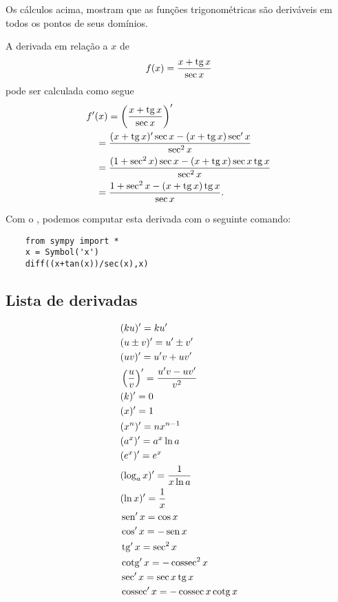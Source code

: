 \begin{obs}
  Os cálculos acima, mostram que as funções trigonométricas são deriváveis em todos os pontos de seus domínios.
\end{obs}

\begin{ex}
  A derivada em relação a $x$ de
  \begin{equation}
    f(x) = \frac{x + \operatorname{tg} x}{\sec x}
  \end{equation}
  pode ser calculada como segue
  \begin{align}
    & f'(x) = \left(\frac{x+\operatorname{tg} x}{\sec x}\right)' \\
    & \text{}\quad = \frac{(x+\operatorname{tg} x)'\sec x - (x+\operatorname{tg} x)\sec' x}{\sec^2 x} \\
    & \text{}\quad = \frac{(1+\sec^2 x)\sec x - (x+\operatorname{tg} x)\sec x\operatorname{tg} x}{\sec^2 x} \\
    & \text{}\quad = \frac{1+\sec^2 x - (x+\operatorname{tg} x)\operatorname{tg} x}{\sec x}.
  \end{align}

  \ifispython
  Com o \sympy, podemos computar esta derivada com o seguinte comando:
\begin{lstlisting}
    from sympy import *
    x = Symbol('x')
    diff((x+tan(x))/sec(x),x)
  \end{lstlisting}
  \fi
\end{ex}

\subsection{Lista de derivadas}

\begin{align}
  & (ku)' = ku' \\
  & (u\pm v)' = u' \pm v'\\
  & (uv)' = u'v + uv' \\
  & \left(\frac{u}{v}\right)' = \frac{u'v - uv'}{v^2} \\
  & (k)' = 0\\
  & (x)' = 1\\
  & (x^n)' = nx^{n-1}\\
  & (a^x)' = a^x\ln a \\
  & (e^x)' = e^x \\
  & (\log_a x)' = \frac{1}{x\ln a}\\
  & (\ln x)' = \frac{1}{x}\\
  & \operatorname{sen}' x = \cos x \\
  & \cos' x = - \operatorname{sen} x\\
  & \operatorname{tg}' x = \sec^2 x \\
  & \operatorname{cotg}' x = -\operatorname{cossec}^2 x \\
  & \sec' x = \sec x \operatorname{tg} x \\
  & \operatorname{cossec}' x = -\operatorname{cossec} x\operatorname{cotg} x
\end{align}

